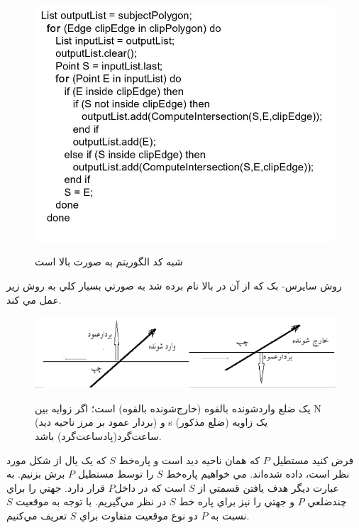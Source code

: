 \documentclass{book}
\begin{document}
\begin{figure}[h!]
    \begin{center}
        \includegraphics[width=\linewidth]{clip_algo.jpg}
        \label{clip_algo}
        \caption{شبه کد الگوريتم به صورت بالا است}
    \end{center}
\end{figure}
    

روش سايرس- بک که از آن در بالا نام برده شد به صورتي بسيار کلي به روش زير عمل مي کند.

\begin{figure}[h!]
    \begin{center}
        \includegraphics[width=\linewidth]{cyres.png}
        \label{cyres}
        \caption{يک ضلع واردشونده بالقوه (خارج‌شونده بالقوه) است؛ اگر زوايه بين N  (بردار عمود بر مرز ناحيه ديد) و s (ضلع مذکور) يک زاويه ساعت‌گرد(پادساعت‌گرد) باشد.}
    \end{center}
\end{figure}

فرض کنيد مستطيل $P$ که همان ناحيه ديد است و پاره‌خط $S$ که يک يال از شکل مورد نظر است، داده شده‌اند. مي خواهيم پاره‌خط $S$ را توسط مستطيل $P$ برش بزنيم. به عبارت ديگر هدف يافتن قسمتي از $S$ است كه در داخل$P$ قرار دارد. جهتي را براي چندضلعي $P$ و جهتي را نيز براي پاره خط $S$ در نظر مي‌گيريم. با توجه به موقعيت $S$ نسبت به $P$ دو نوع موقعيت متفاوت براي $S$ تعريف مي‌کنيم.
\end{document}
